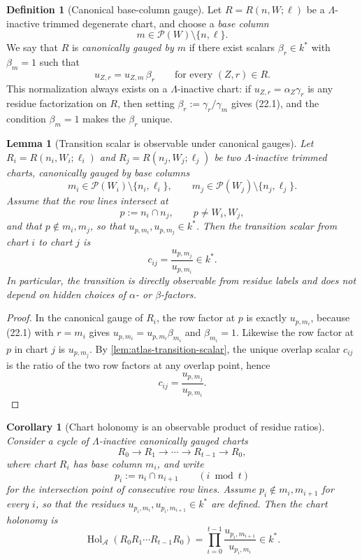 \documentclass[11pt]{amsart}
\numberwithin{equation}{section}
\theoremstyle{plain}
\newtheorem{lemma}[theorem]{Lemma}
\newtheorem{corollary}[theorem]{Corollary}
\theoremstyle{definition}
\newtheorem{definition}[theorem]{Definition}
\theoremstyle{remark}
\newcommand{\Lam}{\Lambda}
\begin{document}
\begin{definition}[Canonical base-column gauge]
\label{def:canonical-base-column-gauge}
Let $R=R(n,W;\ell)$ be a $\Lam$-inactive trimmed degenerate chart, and choose a \emph{base column}
\[
m\in \mathcal P(W)\setminus\{n,\ell\}.
\]
We say that $R$ is \emph{canonically gauged by $m$} if there exist scalars $\beta_r\in k^*$ with $\beta_m=1$ such that
\[
u_{Z,r}=u_{Z,m}\,\beta_r
\qquad\text{for every }(Z,r)\in R.
\tag{22.1}
\]
This normalization always exists on a $\Lam$-inactive chart: if $u_{Z,r}=\alpha_Z\gamma_r$ is any residue factorization on $R$, then setting
$\beta_r:=\gamma_r/\gamma_m$ gives \textup{(22.1)}, and the condition $\beta_m=1$ makes the $\beta_r$ unique.
\end{definition}

\begin{lemma}[Transition scalar is observable under canonical gauges]
\label{lem:observable-transition-scalar}
Let $R_i=R(n_i,W_i;\ell_i)$ and $R_j=R(n_j,W_j;\ell_j)$ be two $\Lam$-inactive trimmed charts, canonically gauged by base columns
\[
m_i\in \mathcal P(W_i)\setminus\{n_i,\ell_i\},
\qquad
m_j\in \mathcal P(W_j)\setminus\{n_j,\ell_j\}.
\]
Assume that the row lines intersect at
\[
p:=n_i\cap n_j,
\qquad p\neq W_i,W_j,
\]
and that $p\notin m_i,m_j$, so that $u_{p,m_i},u_{p,m_j}\in k^*$. Then the transition scalar from chart $i$ to chart $j$ is
\[
c_{ij}=\frac{u_{p,m_j}}{u_{p,m_i}}\in k^*.
\tag{22.2}
\]
In particular, the transition is directly observable from residue labels and does not depend on hidden choices of $\alpha$- or $\beta$-factors.
\end{lemma}

\begin{proof}
In the canonical gauge of $R_i$, the row factor at $p$ is exactly $u_{p,m_i}$, because \textup{(22.1)} with $r=m_i$ gives
$u_{p,m_i}=u_{p,m_i}\beta_{m_i}$ and $\beta_{m_i}=1$. Likewise the row factor at $p$ in chart $j$ is $u_{p,m_j}$. By
\cref{lem:atlas-transition-scalar}, the unique overlap scalar $c_{ij}$ is the ratio of the two row factors at any overlap point, hence
\[
c_{ij}=\frac{u_{p,m_j}}{u_{p,m_i}}.
\]
\end{proof}

\begin{corollary}[Chart holonomy is an observable product of residue ratios]
\label{cor:observable-chart-holonomy}
Consider a cycle of $\Lam$-inactive canonically gauged charts
\[
R_0\to R_1\to \cdots \to R_{t-1}\to R_0,
\]
where chart $R_i$ has base column $m_i$, and write
\[
p_i:=n_i\cap n_{i+1}
\qquad (i\bmod t)
\]
for the intersection point of consecutive row lines. Assume $p_i\notin m_i,m_{i+1}$ for every $i$, so that the residues
$u_{p_i,m_i},u_{p_i,m_{i+1}}\in k^*$ are defined. Then the chart holonomy is
\[
\operatorname{Hol}_{\mathcal A}(R_0R_1\cdots R_{t-1}R_0)
=\prod_{i=0}^{t-1}\frac{u_{p_i,m_{i+1}}}{u_{p_i,m_i}}\in k^*.
\tag{22.3}
\]
\end{corollary}
\end{document}
